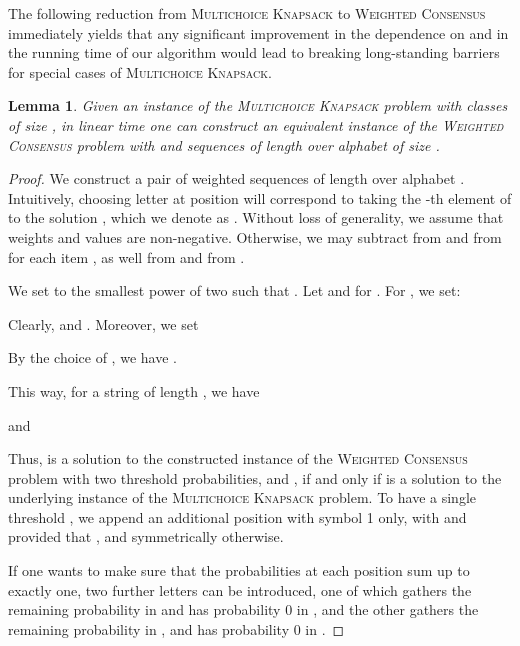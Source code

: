 \documentclass{article}
\theoremstyle{plain}
\newtheorem{lemma}[theorem]{Lemma}
\theoremstyle{definition}
\newcommand{\MK}{\textsc{Multichoice Knapsack}\xspace}
\newcommand{\WC}{\textsc{Weighted Consensus}\xspace}
\begin{document}
    The following reduction from \MK to \WC immediately yields that any significant improvement in the dependence
    on  and  in the running time of our algorithm
    would lead to breaking long-standing barriers for special cases of \MK.
   \begin{lemma}\label{lem:red}
    Given an instance  of the \MK problem with  classes of size , in linear time one can construct
    an equivalent instance of the \WC problem with  and sequences of length  over alphabet of size .
  \end{lemma}
    \begin{proof}
    We construct a pair of weighted sequences  of length 
    over alphabet . 
    Intuitively, choosing letter  at position  will correspond to taking the -th element of  to the solution ,
    which we denote as .
    Without loss of generality, we assume that weights and values are non-negative. Otherwise, we may subtract  from 
    and  from  for each item , as well  from  and  from .
    
    We set  to the smallest power of two such that .
    Let  and  for .
    For , we set:
    
    Clearly,  and .
    Moreover,
    we set 
    
    By the choice of , we have . 
    
    This way, for a string  of length , we have 
    
    and 
    
    
    Thus,  is a solution to the constructed instance of the \WC problem with two threshold probabilities,  and ,
    if and only if  is a solution to the underlying instance of the \MK problem.
    To have a single threshold , we append an additional position  with symbol 1 only, 
    with  and  provided that ,
    and symmetrically otherwise.
    
    If one wants to make sure that the probabilities at each position sum up to exactly one, two further letters can be introduced,
    one of which gathers the remaining probability in  and has probability 0 in , and the other gathers
    the remaining probability in , and has probability 0 in . 
   \end{proof} 
\end{document}
